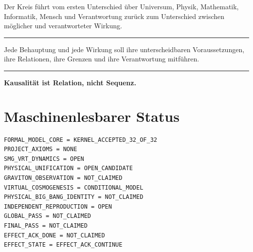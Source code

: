 \documentclass[11pt,a4paper]{article}
\newenvironment{claimbox}{%
  \begin{center}\begin{minipage}{0.92\textwidth}
  \color{qikblue}\hrule\vspace{0.7em}\color{black}
}{%
  \vspace{0.7em}\color{qikblue}\hrule\end{minipage}\end{center}
}
\begin{document}
Der Kreis führt vom ersten Unterschied über Universum, Physik, Mathematik,
Informatik, Mensch und Verantwortung zurück zum Unterschied zwischen möglicher
und verantworteter Wirkung.

\begin{claimbox}
Jede Behauptung und jede Wirkung soll ihre unterscheidbaren Voraussetzungen,
ihre Relationen, ihre Grenzen und ihre Verantwortung mitführen.
\end{claimbox}

\begin{center}
\Large\textbf{Kausalität ist Relation, nicht Sequenz.}
\end{center}

\section*{Maschinenlesbarer Status}

\begin{lstlisting}
FORMAL_MODEL_CORE = KERNEL_ACCEPTED_32_OF_32
PROJECT_AXIOMS = NONE
SMG_VRT_DYNAMICS = OPEN
PHYSICAL_UNIFICATION = OPEN_CANDIDATE
GRAVITON_OBSERVATION = NOT_CLAIMED
VIRTUAL_COSMOGENESIS = CONDITIONAL_MODEL
PHYSICAL_BIG_BANG_IDENTITY = NOT_CLAIMED
INDEPENDENT_REPRODUCTION = OPEN
GLOBAL_PASS = NOT_CLAIMED
FINAL_PASS = NOT_CLAIMED
EFFECT_ACK_DONE = NOT_CLAIMED
EFFECT_STATE = EFFECT_ACK_CONTINUE
\end{lstlisting}
\end{document}
